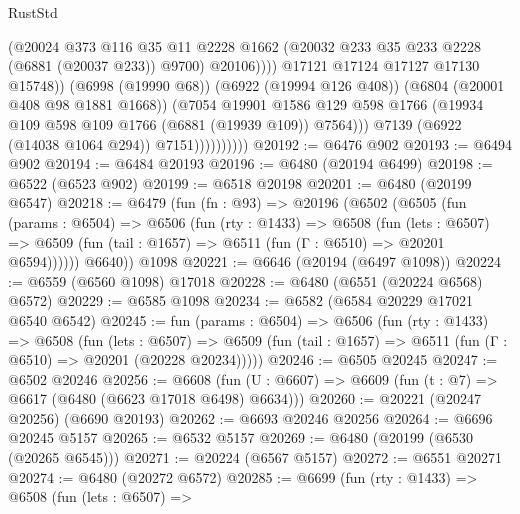 \begin{lexlean}{RustStd}
\begin{coremodule}
                                    (@20024
                                      @373
                                      @116
                                      @35
                                      @11
                                      @2228
                                      @1662
                                      (@20032 @233 @35 @233 @2228 (@6881 (@20037 @233)) @9700)
                                      @20106))))
                              @17121
                              @17124
                              @17127
                              @17130
                              @15748))
                          (@6998 (@19990 @68))
                          (@6922 (@19994 @126 @408))
                          (@6804 (@20001 @408 @98 @1881 @1668))
                          (@7054
                            @19901
                            @1586
                            @129
                            @598
                            @1766
                            (@19934 @109 @598 @109 @1766 (@6881 (@19939 @109)) @7564)))
                        @7139
                        (@6922 (@14038 @1064 @294))
                        @7151))))))))))
@20192 := @6476 @902
@20193 := @6494 @902
@20194 := @6484 @20193
@20196 := @6480 (@20194 @6499)
@20198 := @6522 (@6523 @902)
@20199 := @6518 @20198
@20201 := @6480 (@20199 @6547)
@20218 := @6479
    (fun (fn : @93) =>
    @20196
      (@6502
        (@6505
          (fun (params : @6504) =>
          @6506
            (fun (rty : @1433) =>
            @6508
              (fun (lets : @6507) =>
              @6509 (fun (tail : @1657) => @6511 (fun (Γ : @6510) => @20201 @6594))))))
        @6640))
    @1098
@20221 := @6646 (@20194 (@6497 @1098))
@20224 := @6559 (@6560 @1098) @17018
@20228 := @6480 (@6551 (@20224 @6568) @6572)
@20229 := @6585 @1098
@20234 := @6582 (@6584 @20229 @17021 @6540 @6542)
@20245 := fun (params : @6504) =>
  @6506
    (fun (rty : @1433) =>
    @6508
      (fun (lets : @6507) =>
      @6509 (fun (tail : @1657) => @6511 (fun (Γ : @6510) => @20201 (@20228 @20234)))))
@20246 := @6505 @20245
@20247 := @6502 @20246
@20256 := @6608
    (fun (U : @6607) => @6609 (fun (t : @7) => @6617 (@6480 (@6623 @17018 @6498) @6634)))
@20260 := @20221 (@20247 @20256) (@6690 @20193)
@20262 := @6693 @20246 @20256
@20264 := @6696 @20245 @5157
@20265 := @6532 @5157
@20269 := @6480 (@20199 (@6530 (@20265 @6545)))
@20271 := @20224 (@6567 @5157)
@20272 := @6551 @20271
@20274 := @6480 (@20272 @6572)
@20285 := @6699
    (fun (rty : @1433) =>
    @6508
      (fun (lets : @6507) =>

\end{coremodule}
\end{lexlean}
